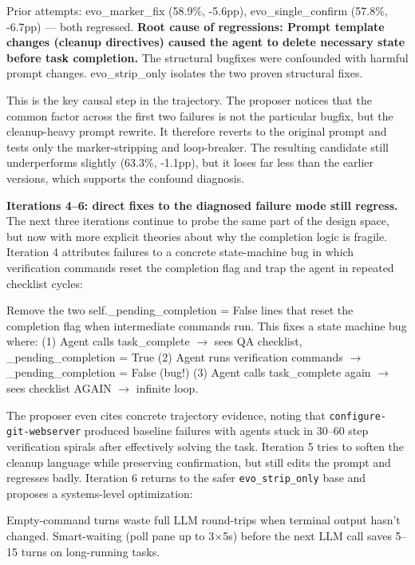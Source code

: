 \begin{logbox}
Prior attempts: evo\_marker\_fix (58.9\%, -5.6pp), evo\_single\_confirm (57.8\%, -6.7pp) --- both regressed. \textbf{Root cause of regressions: Prompt template changes (cleanup directives) caused the agent to delete necessary state before task completion.} The structural bugfixes were confounded with harmful prompt changes. evo\_strip\_only isolates the two proven structural fixes.
\end{logbox}

This is the key causal step in the trajectory.
The proposer notices that the common factor across the first two failures is not the particular bugfix, but the cleanup-heavy prompt rewrite.
It therefore reverts to the original prompt and tests only the marker-stripping and loop-breaker.
The resulting candidate still underperforms slightly (63.3\%, -1.1pp), but it loses far less than the earlier versions, which supports the confound diagnosis.

\textbf{Iterations 4--6: direct fixes to the diagnosed failure mode still regress.}
The next three iterations continue to probe the same part of the design space, but now with more explicit theories about why the completion logic is fragile.
Iteration 4 attributes failures to a concrete state-machine bug in which verification commands reset the completion flag and trap the agent in repeated checklist cycles:

\begin{logbox}
Remove the two self.\_pending\_completion = False lines that reset the completion flag when intermediate commands run. This fixes a state machine bug where: (1) Agent calls task\_complete $\rightarrow$ sees QA checklist, \_pending\_completion = True (2) Agent runs verification commands $\rightarrow$ \_pending\_completion = False (bug!) (3) Agent calls task\_complete again $\rightarrow$ sees checklist AGAIN $\rightarrow$ infinite loop.
\end{logbox}

The proposer even cites concrete trajectory evidence, noting that \texttt{configure-git-webserver} produced baseline failures with agents stuck in 30--60 step verification spirals after effectively solving the task.
Iteration 5 tries to soften the cleanup language while preserving confirmation, but still edits the prompt and regresses badly.
Iteration 6 returns to the safer \texttt{evo\_strip\_only} base and proposes a systems-level optimization:

\begin{logbox}
Empty-command turns waste full LLM round-trips when terminal output hasn't changed. Smart-waiting (poll pane up to 3$\times$5s) before the next LLM call saves 5--15 turns on long-running tasks.
\end{logbox}

